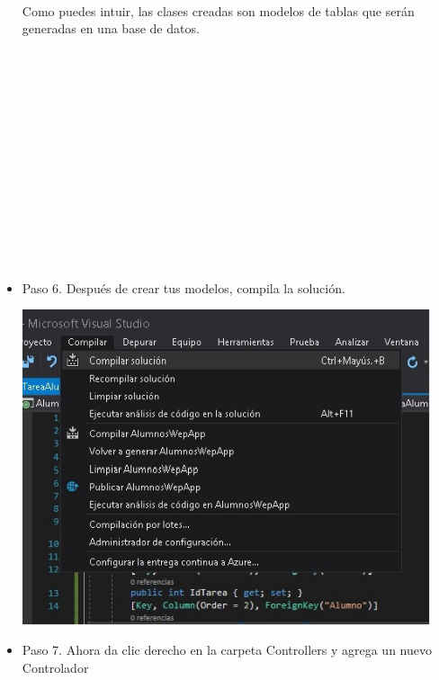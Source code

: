 \begin{flushleft}
\begin{itemize}
\textbf{ }\\
Como puedes intuir, las clases creadas son modelos de tablas que serán generadas en una base de datos. 
\textbf{ }\\
\textbf{ }\\
\textbf{ }\\
\textbf{ }\\
\textbf{ }\\
\textbf{ }\\
\textbf{ }\\
\textbf{ }\\
\textbf{ }\\
\textbf{ }\\
\textbf{ }\\
\textbf{ }\\
\textbf{ }\\
\textbf{ }\\
\item Paso 6. Después de crear tus modelos, compila la solución.
\begin{center}
	\includegraphics[width=12cm]{./Imagenes/paso6} 
	\end{center}

\item  Paso 7. Ahora da clic derecho en la carpeta Controllers y agrega un nuevo Controlador


\end{itemize}
\end{flushleft}
